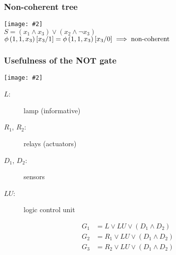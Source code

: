 \documentclass{beamer}
\newcommand{\includegraphicsaspectratio}[2][1]{%
  \texttt{[image: \#2]}%
}
\def\ftcoherencyop{\ensuremath\operatorname{\phi}}
\newcommand{\ftcoherency}[1]{\ensuremath\ftcoherencyop\left(#1\right)}
\newcommand{\replace}[2]{\ensuremath\left[#1\middle/#2\right]}
\begin{document}
\begin{frame}
	\frametitle{Non-coherent tree}
	\begin{center}
		\includegraphicsaspectratio[0.55]{non-coherent-ft-example}\\
		$S = \left(x_1 \land x_3\right) \lor \left(x_2 \land \lnot x_3\right)$\\
		$\ftcoherency{1,1,x_3}\replace{x_3}{1}=\ftcoherency{1,1,x_3}\replace{x_3}{0} \implies \text{non-coherent}$
	\end{center}
\end{frame}

\begin{frame}
	\frametitle{Usefulness of the NOT gate}
	\begin{center}
		\begin{minipage}{0.6\textwidth}
			\includegraphicsaspectratio[1]{ft-generic-failure-gas-detection-system}
		\end{minipage}
		\begin{minipage}{0.39\textwidth}
			\footnotesize
			\begin{description}
				\item[$L$:] lamp (informative)
				\item[$R_1$, $R_2$:] relays (actuators)
				\item[$D_1$, $D_2$:] sensors
				\item[$LU$:] logic control unit
			\end{description}
			\begin{align*}
				G_1 & = L \lor LU \lor \left(D_1 \land D_2\right)\\
				G_2 & = R_1 \lor LU \lor \left(D_1 \land D_2\right)\\
				G_3 & = R_2 \lor LU \lor \left(D_1 \land D_2\right)
			\end{align*}
		\end{minipage}
	\end{center}
\end{frame}
\end{document}
